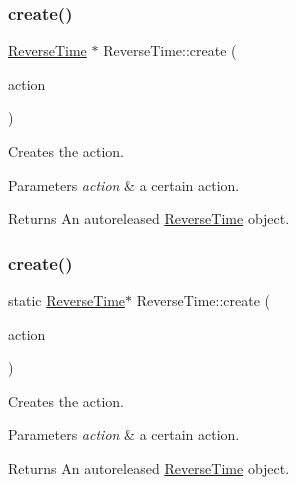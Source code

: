 \subsubsection{\texorpdfstring{create()}{create()}\hspace{0.1cm}{\footnotesize\ttfamily [1/2]}}
{\footnotesize\ttfamily \hyperlink{classReverseTime}{Reverse\+Time} $\ast$ Reverse\+Time\+::create (\begin{DoxyParamCaption}\item[{\hyperlink{classFiniteTimeAction}{Finite\+Time\+Action} $\ast$}]{action }\end{DoxyParamCaption})\hspace{0.3cm}{\ttfamily [static]}}

Creates the action.


\begin{DoxyParams}{Parameters}
{\em action} & a certain action. \\
\hline
\end{DoxyParams}
\begin{DoxyReturn}{Returns}
An autoreleased \hyperlink{classReverseTime}{Reverse\+Time} object. 
\end{DoxyReturn}
\mbox{\label{classReverseTime_acb56561704925e0ce3aa059ba2f85bf0}} 
\subsubsection{\texorpdfstring{create()}{create()}\hspace{0.1cm}{\footnotesize\ttfamily [2/2]}}
{\footnotesize\ttfamily static \hyperlink{classReverseTime}{Reverse\+Time}$\ast$ Reverse\+Time\+::create (\begin{DoxyParamCaption}\item[{\hyperlink{classFiniteTimeAction}{Finite\+Time\+Action} $\ast$}]{action }\end{DoxyParamCaption})\hspace{0.3cm}{\ttfamily [static]}}

Creates the action.


\begin{DoxyParams}{Parameters}
{\em action} & a certain action. \\
\hline
\end{DoxyParams}
\begin{DoxyReturn}{Returns}
An autoreleased \hyperlink{classReverseTime}{Reverse\+Time} object. 
\end{DoxyReturn}
\mbox{\label{classReverseTime_ae1bcb66b1fa2a6eee710e241ff8872b9}} 
